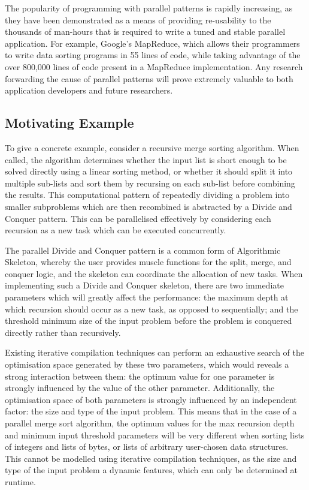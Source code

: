The popularity of programming with parallel patterns is rapidly
increasing, as they have been demonstrated as a means of providing
re-usability to the thousands of man-hours that is required to write a
tuned and stable parallel application. For example, Google's
MapReduce, which allows their programmers to write data sorting
programs in 55 lines of code, while taking advantage of the over
800,000 lines of code present in a MapReduce implementation. Any
research forwarding the cause of parallel patterns will prove
extremely valuable to both application developers and future
researchers.

\subsection{Motivating Example}

To give a concrete example, consider a recursive merge sorting
algorithm. When called, the algorithm determines whether the input
list is short enough to be solved directly using a linear sorting
method, or whether it should split it into multiple sub-lists and sort
them by recursing on each sub-list before combining the results. This
computational pattern of repeatedly dividing a problem into smaller
subproblems which are then recombined is abstracted by a Divide and
Conquer pattern. This can be parallelised effectively by considering
each recursion as a new task which can be executed concurrently.

The parallel Divide and Conquer pattern is a common form of
Algorithmic Skeleton, whereby the user provides muscle functions for
the split, merge, and conquer logic, and the skeleton can coordinate
the allocation of new tasks. When implementing such a Divide and
Conquer skeleton, there are two immediate parameters which will
greatly affect the performance: the maximum depth at which recursion
should occur as a new task, as opposed to sequentially; and the
threshold minimum size of the input problem before the problem is
conquered directly rather than recursively.

Existing iterative compilation techniques can perform an exhaustive
search of the optimisation space generated by these two parameters,
which would reveals a strong interaction between them: the optimum
value for one parameter is strongly influenced by the value of the
other parameter. Additionally, the optimisation space of both
parameters is strongly influenced by an independent factor: the size
and type of the input problem. This means that in the case of a
parallel merge sort algorithm, the optimum values for the max
recursion depth and minimum input threshold parameters will be very
different when sorting lists of integers and lists of bytes, or lists
of arbitrary user-chosen data structures. This cannot be modelled
using iterative compilation techniques, as the size and type of the
input problem a dynamic features, which can only be determined at
runtime.

